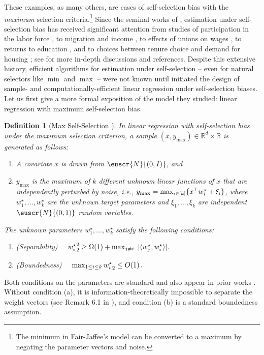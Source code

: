 \documentclass[11pt,letterpaper]{article}
\DeclarePairedDelimiter{\set}{\{}{\}}
\theoremstyle{plain}
\newtheorem{definition}{Definition}
\theoremstyle{definition}
\theoremstyle{remark}
\def\sabs#1{| #1 |}
\newcommand{\sinangle}[1]{\ensuremath{\langle#1\rangle}}
\newcommand{\inparen}[1]{\ensuremath{\left(#1\right)}}
\let\norm\relax
\newcommand{\norm}[1]{\ensuremath{\left\lVert #1 \right\rVert}}
\newcommand{\R}{\mathbb{R}}
\newcommand{\customcal}[1]{\euscr{#1}}
\newcommand{\cN}{\customcal{N}}
\newcommand{\ie}{\emph{i.e.}}
\newcommand{\normal}[2]{\cN{\inparen{#1,#2}}}
\newcommand{\ymax}{y_{\max}}
\begin{document}
    
    These examples, as many others, are cases of self-selection bias with the \textit{maximum} selection criteria.\footnote{{The minimum in Fair-Jaffee's model can be converted to a maximum by negating the parameter vectors and noise.}}  
    Since the seminal works of \citet{roy1951earnings,fair1972methods}, 
    estimation under self-selection bias has received significant attention from studies of participation in the labor force \cite{heckman1974shadow,hanoch1976multivariate,NELSON1977309,heckman1979sample,Hanoch1980,Cogan1980}, 
    to migration and income \cite{nakosteen1980migration,borjas1987selfSelection}, 
    to effects of unions on wages \cite{lee1978union,abowd1982job}, 
    to returns to education \cite{willis1979education,kenny1979college,griliches1978missing}, 
    and to choices between tenure choice and demand for housing \cite{lee1978estimation,king1980tenure,rosen1979housing}; see \cite{maddala1986limited} {for more in-depth discussions and references}. 
    {Despite this extensive history, efficient algorithms for estimation under self-selection -- even for natural selectors like \( \min \) and \( \max \) -- were not known until \citet{cherapanamjeri2023selfselection} initiated the design of sample- and computationally-efficient linear regression under self-selection biases.}
    Let us first give a more formal exposition of the model they studied: linear regression with maximum self-selection bias. 
    \begin{definition}
    [Max Self-Selection \cite{cherapanamjeri2023selfselection}]
    In linear regression with self-selection bias under the maximum selection criterion, a sample $(x,\ymax) \in \R^d \times \R$ is generated as follows: 
    \begin{enumerate}
        \item A covariate $x$ is drawn from $\normal{0}{I}$, and 
        \item $\ymax$ is the maximum of $k$ different unknown linear functions of $x$ that are independently perturbed by noise, \ie{}, $\ymax = \max_{i \in [k]} \set{x^\top w_i^\star + \xi_i}$, where $w_1^\star,\dots,w_k^\star$ are the unknown target parameters and $\xi_1,\dots,\xi_k$ are independent $\normal{0}{1}$ random variables.
    \end{enumerate}
    The unknown parameters $w_1^\star,\dots,w_k^\star$ satisfy the following conditions: %
    \begin{enumerate}
        \item[(a)] (Separability)~~  $ \norm{w^\star_i}_2^2 
            \geq \Omega(1) + \max_{j\neq i}~\sabs{\sinangle{w^\star_j, w^\star_i}}.$
        \item[(b)] (Boundedness) ~~$\max_{1\leq i\leq k}\norm{w^\star_i}_2\leq O(1)\,.$
    \end{enumerate}
    \label{def:ssb}
    \end{definition}
    \noindent Both conditions on the parameters are standard and also appear in prior works  \cite{cherapanamjeri2023selfselection,gaitonde2024selfselection}.
    Without condition (a), it is information-theoretically impossible to separate the weight vectors (see Remark 6.1 in \cite{gaitonde2024selfselection}), and condition (b) is a standard boundedness assumption.
    
\end{document}
